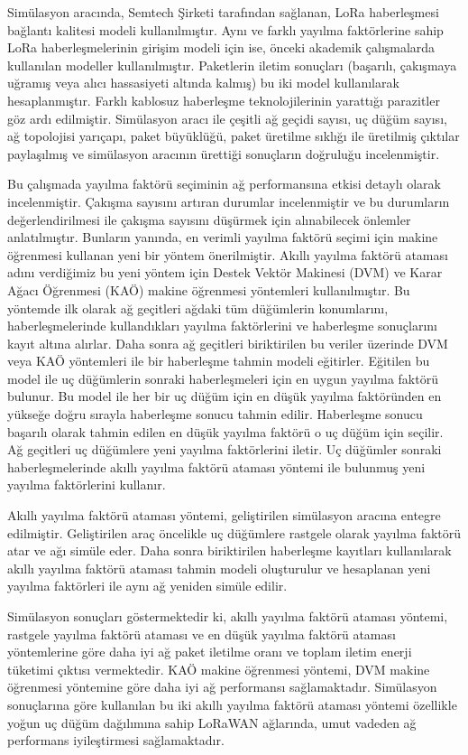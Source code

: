 Simülasyon aracında, Semtech Şirketi tarafından sağlanan, LoRa haberleşmesi bağlantı kalitesi modeli kullanılmıştır. Aynı ve farklı yayılma faktörlerine sahip LoRa haberleşmelerinin girişim modeli için ise, önceki akademik çalışmalarda kullanılan modeller kullanılmıştır. Paketlerin iletim sonuçları (başarılı, çakışmaya uğramış veya alıcı hassasiyeti altında kalmış) bu iki model kullanılarak hesaplanmıştır. Farklı kablosuz haberleşme teknolojilerinin yarattığı parazitler göz ardı edilmiştir. Simülasyon aracı ile çeşitli ağ geçidi sayısı, uç düğüm sayısı, ağ topolojisi yarıçapı, paket büyüklüğü, paket üretilme sıklığı ile üretilmiş çıktılar paylaşılmış ve simülasyon aracının ürettiği sonuçların doğruluğu incelenmiştir.

Bu çalışmada yayılma faktörü seçiminin ağ performansına etkisi detaylı olarak incelenmiştir. Çakışma sayısını artıran durumlar incelenmiştir ve bu durumların değerlendirilmesi ile çakışma sayısını düşürmek için alınabilecek önlemler anlatılmıştır. Bunların yanında, en verimli yayılma faktörü seçimi için makine öğrenmesi kullanan yeni bir yöntem önerilmiştir. Akıllı yayılma faktörü ataması adını verdiğimiz bu yeni yöntem için Destek Vektör Makinesi (DVM) ve Karar Ağacı Öğrenmesi (KAÖ) makine öğrenmesi yöntemleri kullanılmıştır. Bu yöntemde ilk olarak ağ geçitleri ağdaki tüm düğümlerin konumlarını, haberleşmelerinde kullandıkları yayılma faktörlerini ve haberleşme sonuçlarını kayıt altına alırlar. Daha sonra ağ geçitleri biriktirilen bu veriler üzerinde DVM veya KAÖ yöntemleri ile bir haberleşme tahmin modeli eğitirler. Eğitilen bu model ile uç düğümlerin sonraki haberleşmeleri için en uygun yayılma faktörü bulunur. Bu model ile her bir uç düğüm için en düşük yayılma faktöründen en yükseğe doğru sırayla haberleşme sonucu tahmin edilir. Haberleşme sonucu başarılı olarak tahmin edilen en düşük yayılma faktörü o uç düğüm için seçilir. Ağ geçitleri uç düğümlere yeni yayılma faktörlerini iletir. Uç düğümler sonraki haberleşmelerinde akıllı yayılma faktörü ataması yöntemi ile bulunmuş yeni yayılma faktörlerini kullanır.

Akıllı yayılma faktörü ataması yöntemi, geliştirilen simülasyon aracına entegre edilmiştir. Geliştirilen araç öncelikle uç düğümlere rastgele olarak yayılma faktörü atar ve ağı simüle eder. Daha sonra biriktirilen haberleşme kayıtları kullanılarak akıllı yayılma faktörü ataması tahmin modeli oluşturulur ve hesaplanan yeni yayılma faktörleri ile aynı ağ yeniden simüle edilir.

Simülasyon sonuçları göstermektedir ki, akıllı yayılma faktörü ataması yöntemi, rastgele yayılma faktörü ataması ve en düşük yayılma faktörü ataması yöntemlerine göre daha iyi ağ paket iletilme oranı ve toplam iletim enerji tüketimi çıktısı vermektedir. KAÖ makine öğrenmesi yöntemi, DVM makine öğrenmesi yöntemine göre daha iyi ağ performansı sağlamaktadır. Simülasyon sonuçlarına göre kullanılan bu iki akıllı yayılma faktörü ataması yöntemi özellikle yoğun uç düğüm dağılımına sahip LoRaWAN ağlarında, umut vadeden ağ performans iyileştirmesi sağlamaktadır.
